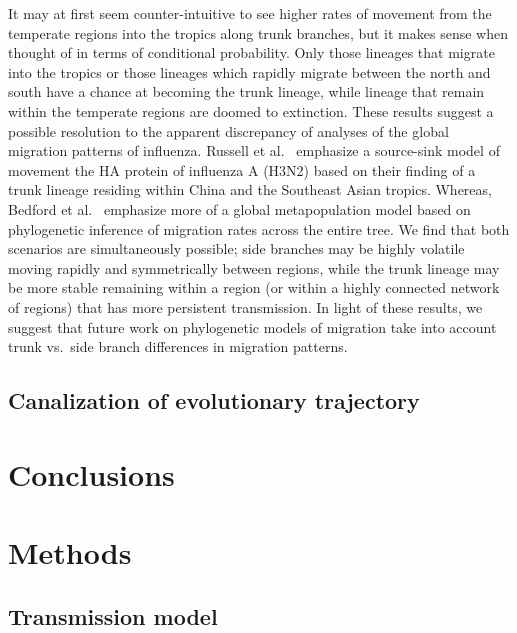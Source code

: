 \documentclass[11pt,oneside,letterpaper]{article}
\begin{document}
It may at first seem counter-intuitive to see higher rates of movement from the temperate regions into the tropics along trunk branches, but it makes sense when thought of in terms of conditional probability.  Only those lineages that migrate into the tropics or those lineages which rapidly migrate between the north and south have a chance at becoming the trunk lineage, while lineage that remain within the temperate regions are doomed to extinction.  These results suggest a possible resolution to the apparent discrepancy of analyses of the global migration patterns of influenza.  Russell et al.\ \cite{Russell08} emphasize a source-sink model of movement the HA protein of influenza A (H3N2) based on their finding of a trunk lineage residing within China and the Southeast Asian tropics.  Whereas, Bedford et al.\ \cite{Bedford10} emphasize more of a global metapopulation model based on phylogenetic inference of migration rates across the entire tree.  We find that both scenarios are simultaneously possible; side branches may be highly volatile moving rapidly and symmetrically between regions, while the trunk lineage may be more stable remaining within a region (or within a highly connected network of regions) that has more persistent transmission.  In light of these results, we suggest that future work on phylogenetic models of migration take into account trunk vs.\ side branch differences in migration patterns.

\subsection*{Canalization of evolutionary trajectory}

\section*{Conclusions}

\section*{Methods}

\subsection*{Transmission model}
\end{document}
